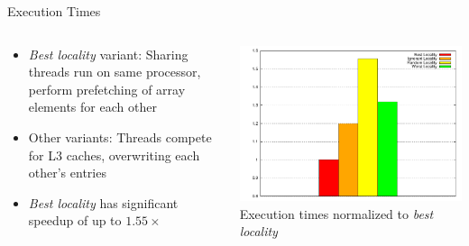 \begin{frame}{Execution Times}
  \begin{columns}[c]
    \begin{column}{0.49\textwidth}
      \begin{itemize}
      \item \emph{Best locality} variant: Sharing threads run on same
        processor, perform prefetching of array elements for each
        other
      \item Other variants: Threads compete for L3 caches, overwriting
        each other's entries
      \item \emph{Best locality} has significant speedup of up to
        $1.55\times$
  \end{itemize}
    \end{column}
    \begin{column}{0.51\textwidth}
      \begin{center}
        \includegraphics[width=\textwidth]{figures/cache-stress-test-threads} \\
        \tiny{Execution times normalized to \emph{best locality}}
      \end{center}
    \end{column}
  \end{columns}
\end{frame}

